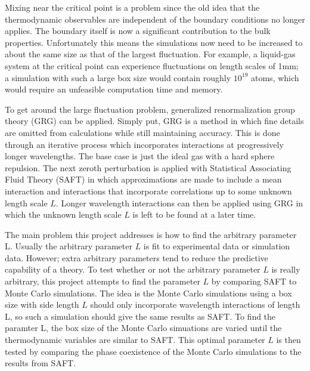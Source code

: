Mixing near the critical point is a problem since the old idea that the thermodynamic observables are independent of the boundary conditions no longer applies. The boundary itself is now a significant contribution to the bulk properties. Unfortunately this means the simulations now need to be increased to about the same size as that of the largest fluctuation. For example, a liquid-gas system at the critical point can experience fluctuations on length scales of 1mm; a simulation with such a large box size would contain roughly $10^{19}$ atoms, which would require an unfeasible computation time and memory.

To get around the large fluctuation problem, generalized renormalization group theory (GRG)\cite{Forte2011} can be applied. Simply put, GRG is a method in which fine details are omitted from calculations while still maintaining accuracy. This is done through an iterative process which incorporates interactions at progressively longer wavelengths. The base case is just the ideal gas with a hard sphere repulsion. The next zeroth perturbation is applied with Statistical Associating Fluid Theory (SAFT) in which approximations are made to include a mean interaction and interactions that incorporate correlations up to some unknown length scale $L$. Longer wavelength interactions can then be applied using GRG in which the unknown length scale $L$ is left to be found at a later time.

The main problem this project addresses is how to find the arbitrary parameter L. Usually the arbitrary parameter $L$ is fit to experimental data or simulation data. However; extra arbitrary parameters tend to reduce the predictive capability of a theory. To test whether or not the arbitrary parameter $L$ is really arbitrary, this project attempts to find the parameter $L$ by comparing SAFT to Monte Carlo simulations. The idea is the Monte Carlo simulations using a box size with side length $L$ should only incorporate wavelength interactions of length L, so such a simulation should give the same results as SAFT. To find the paramter L, the box size of the Monte Carlo simuations are varied until the thermodynamic variables are similar to SAFT. This optimal parameter $L$ is then tested by comparing the phase coexistence of the Monte Carlo simulations to the results from SAFT.